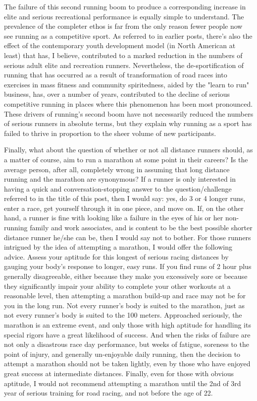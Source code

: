 The failure of this second running boom to produce a corresponding increase in elite and serious recreational performance is equally simple to understand. The prevalence of the completer ethos is far from the only reason fewer people now see running as a competitive sport. As referred to in earlier posts, there's also the effect of the contemporary youth development model (in North American at least) that has, I believe, contributed to a marked reduction in the numbers of serious adult elite and recreation runners. Nevertheless, the de-sportification of running that has occurred as a result of transformation of road races into exercises in mass fitness and community spiritedness, aided by the "learn to run" business, has, over a number of years, contributed to the decline of serious competitive running in places where this phenomenon has been most pronounced. These drivers of running's second boom have not necessarily reduced the numbers of serious runners in absolute terms, but they explain why running as a sport has failed to thrive in proportion to the sheer volume of new participants.

Finally, what about the question of whether or not all distance runners should, as a matter of course, aim to run a marathon at some point in their careers? Is the average person, after all, completely wrong in assuming that long distance running and the marathon are synonymous? If a runner is only interested in having a quick and conversation-stopping answer to the question/challenge referred to in the title of this post, then I would say: yes, do 3 or 4 longer runs, enter a race, get yourself through it in one piece, and move on. If, on the other hand, a runner is fine with looking like a failure in the eyes of his or her non-running family and work associates, and is content to be the best possible shorter distance runner he/she can be, then I would say not to bother. For those runners intrigued by the idea of attempting a marathon, I would offer the following advice. Assess your aptitude for this longest of serious racing distances by gauging your body's response to longer, easy runs. If you find runs of 2 hour plus generally disagreeable, either because they make you excessively sore or because they significantly impair your ability to complete your other workouts at a reasonable level, then attempting a marathon build-up and race may not be for you in the long run. Not every runner's body is suited to the marathon, just as not every runner's body is suited to the 100 meters. Approached seriously, the marathon is an extreme event, and only those with high aptitude for handling its special rigors have a great likelihood of success. And when the risks of failure are not only a disastrous race day performance, but weeks of fatigue, soreness to the point of injury, and generally un-enjoyable daily running, then the decision to attempt a marathon should not be taken lightly, even by those who have enjoyed great success at intermediate distances. Finally, even for those with obvious aptitude, I would not recommend attempting a marathon until the 2nd of 3rd year of serious training for road racing, and not before the age of 22.

